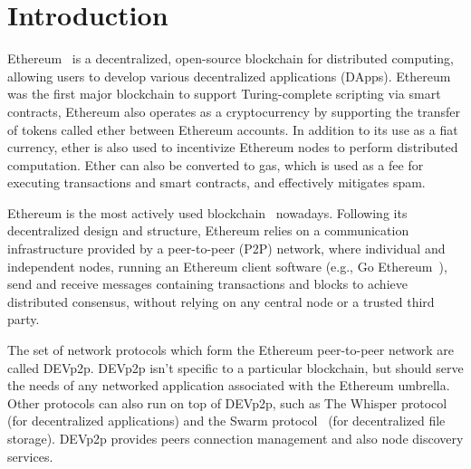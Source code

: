 
\section{Introduction}

Ethereum~\cite{} is a decentralized, open-source blockchain for distributed computing, allowing users to develop various decentralized applications (DApps).  Ethereum  was the first major blockchain to support Turing-complete scripting via smart contracts, Ethereum also operates as a cryptocurrency by supporting the transfer of tokens called ether between Ethereum accounts.
In addition to its use as a fiat currency,  ether is also used to incentivize Ethereum nodes to perform distributed computation. 
Ether can also be converted to gas, which is used as a fee for executing transactions and smart contracts, and effectively mitigates spam. 

Ethereum is the most actively used blockchain~\cite{bloomberg} nowadays.
Following its decentralized design and structure, Ethereum relies on a communication infrastructure provided by a peer-to-peer (P2P) network, where individual and independent nodes, running an Ethereum client software (e.g., Go Ethereum~\cite{go-ethereum}), send and receive messages  containing transactions and blocks to achieve distributed consensus,  without relying on any central node or a trusted third party.

The set of network protocols which form the Ethereum peer-to-peer network are called DEVp2p.  DEVp2p isn't specific to a particular blockchain, but should serve the needs of any networked application associated with the Ethereum umbrella.
Other protocols can also run on top of DEVp2p,  such as 
The Whisper protocol~\cite{} (for decentralized
applications) and the Swarm protocol~\cite{} (for decentralized file
storage).
DEVp2p provides peers connection management and also node discovery services.

